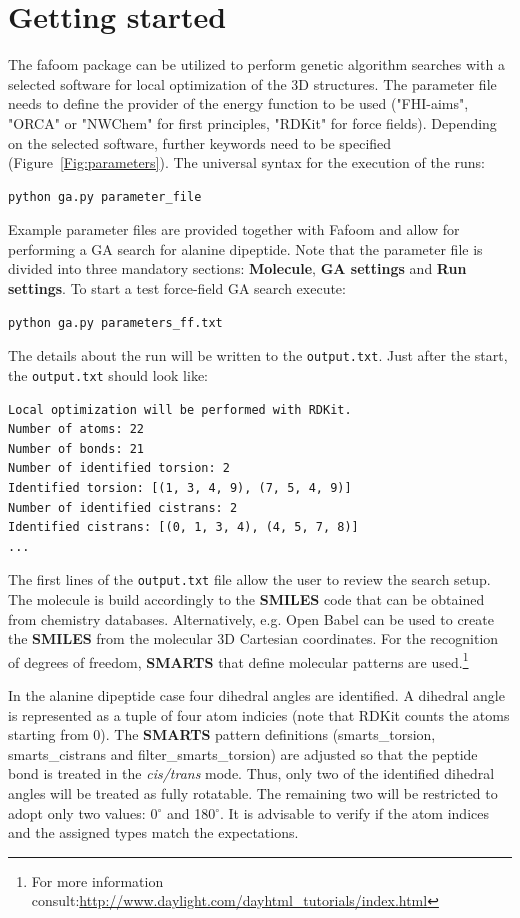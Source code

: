 \documentclass[a4paper]{article}
\begin{document}
\section{Getting started}

The fafoom package can be utilized to perform genetic algorithm searches with a selected software for local optimization of the 3D structures. The parameter file needs to define the provider of the energy function to be used ("FHI-aims", "ORCA" or "NWChem" for first principles, "RDKit" for force fields). Depending on the selected software, further keywords need to be specified  (Figure~\ref{Fig:parameters}). The universal syntax for the execution of the runs:

\begin{verbatim}
python ga.py parameter_file
\end{verbatim}

\noindent
Example parameter files are provided together with Fafoom and allow for performing a GA search for alanine dipeptide. Note that the parameter file is divided into three mandatory sections: \textbf{Molecule}, \textbf{GA settings} and \textbf{Run settings}.  To start a test force-field GA search execute:
\begin{verbatim}
python ga.py parameters_ff.txt
\end{verbatim}
\noindent
The details about the run will be written to the \texttt{output.txt}. Just after the start, the \texttt{output.txt} should look like:
\begin{verbatim}
Local optimization will be performed with RDKit.
Number of atoms: 22
Number of bonds: 21
Number of identified torsion: 2
Identified torsion: [(1, 3, 4, 9), (7, 5, 4, 9)]
Number of identified cistrans: 2
Identified cistrans: [(0, 1, 3, 4), (4, 5, 7, 8)]
...
\end{verbatim}
\noindent
The first lines of the \texttt{output.txt} file allow the user to review the search setup. The molecule is build accordingly to the \textbf{SMILES} code that can be obtained from chemistry databases. Alternatively, e.g. Open Babel can be used to create the \textbf{SMILES} from the molecular 3D Cartesian coordinates. For the recognition of degrees of freedom, \textbf{SMARTS} that define molecular patterns are used.\footnote{For more information consult:\href{http://www.daylight.com/dayhtml_tutorials/index.html}{http://www.daylight.com/dayhtml\_tutorials/index.html}}

In the alanine dipeptide case four dihedral angles are identified. A dihedral angle is represented as a tuple of four atom indicies (note that RDKit counts the atoms starting from 0). The \textbf{SMARTS} pattern definitions (smarts\_torsion, smarts\_cistrans and filter\_smarts\_torsion) are adjusted so that the peptide bond is treated in the \textit{cis/trans} mode. Thus, only two of the identified dihedral angles will be treated as fully rotatable. The remaining two will be restricted to adopt only two values: 0$^{\circ}$ and 180$^{\circ}$.
It is advisable to verify if the atom indices and the assigned types match the expectations.
\end{document}
